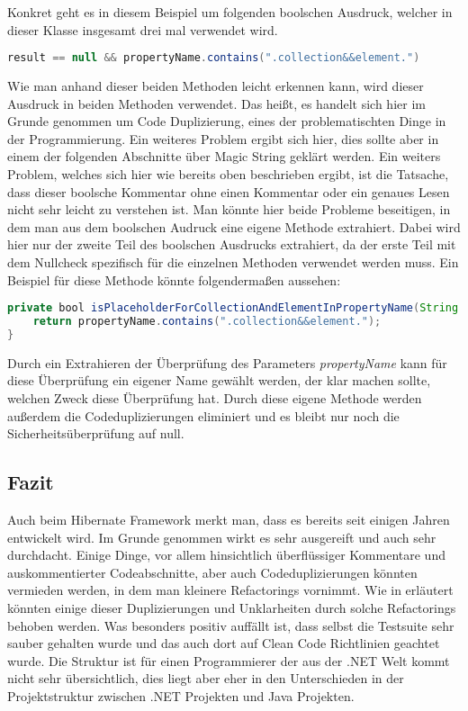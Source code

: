 Konkret geht es in diesem Beispiel um folgenden boolschen Ausdruck, welcher in dieser Klasse insgesamt drei mal verwendet wird.

\begin{lstlisting}[language=Java, caption=Boolscher Audruck, label=lst:GetByPredicate]
result == null && propertyName.contains(".collection&&element.")
\end{lstlisting}

Wie man anhand dieser beiden Methoden leicht erkennen kann, wird dieser Ausdruck in beiden Methoden verwendet. Das heißt, es handelt sich hier im Grunde genommen um Code Duplizierung, eines der problematischten Dinge in der Programmierung. Ein weiteres Problem ergibt sich hier, dies sollte aber in einem der folgenden Abschnitte über Magic String geklärt werden. %
Ein weiters Problem, welches sich hier wie bereits oben beschrieben ergibt, ist die Tatsache, dass dieser boolsche Kommentar ohne einen Kommentar oder ein genaues Lesen nicht sehr leicht zu verstehen ist. Man könnte hier beide Probleme beseitigen, in dem man aus dem boolschen Audruck eine eigene Methode extrahiert. Dabei wird hier nur der zweite Teil des boolschen Ausdrucks extrahiert, da der erste Teil mit dem Nullcheck spezifisch für die einzelnen Methoden verwendet werden muss. Ein Beispiel für diese Methode könnte folgendermaßen aussehen:

\begin{lstlisting}[language=Java, caption=Boolscher Ausdruck neu, label=lst:GetByPredicate]
private bool isPlaceholderForCollectionAndElementInPropertyName(String propertyName) {
	return propertyName.contains(".collection&&element.");
}
\end{lstlisting}

Durch ein Extrahieren der Überprüfung des Parameters \textit{propertyName} kann für diese Überprüfung ein eigener Name gewählt werden, der klar machen sollte, welchen Zweck diese Überprüfung hat. Durch diese eigene Methode werden außerdem die Codeduplizierungen eliminiert und es bleibt nur noch die Sicherheitsüberprüfung auf null.

\subsection{Fazit}
Auch beim Hibernate Framework merkt man, dass es bereits seit einigen Jahren entwickelt wird. Im Grunde genommen wirkt es sehr ausgereift und auch sehr durchdacht. Einige Dinge, vor allem hinsichtlich überflüssiger Kommentare und auskommentierter Codeabschnitte, aber auch Codeduplizierungen könnten vermieden werden, in dem man kleinere Refactorings vornimmt. Wie in \label{cha:BadBoolStatements} erläutert könnten einige dieser Duplizierungen und Unklarheiten durch solche Refactorings behoben werden. Was besonders positiv auffällt ist, dass selbst die Testsuite sehr sauber gehalten wurde und das auch dort auf Clean Code Richtlinien geachtet wurde. Die Struktur ist für einen Programmierer der aus der .NET Welt kommt nicht sehr übersichtlich, dies liegt aber eher in den Unterschieden in der Projektstruktur zwischen .NET Projekten und Java Projekten.
